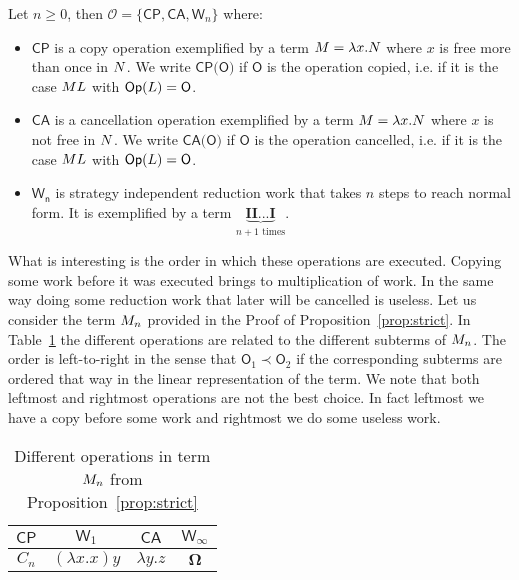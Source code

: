 \begin{definition} Let $n\geq 0$, then $\mathcal{O}=\{\textsf{CP},\textsf{CA},\textsf{W}_n\}$ where:
	\begin{itemize}
		\item $\textsf{CP}$ is a copy operation exemplified by a term $M=\lambda x.N$ where $x$ is free more than once in $N$. We write $\textsf{CP(O)}$ if $\mathsf{O}$ is the operation copied, i.e. if it is the case $ML$ with $\mathsf{Op}(L)=\mathsf{O}$.
		\item $\textsf{CA}$ is a cancellation operation exemplified by a term $M=\lambda x.N$ where $x$ is not free in $N$. We write $\textsf{CA(O)}$ if $\mathsf{O}$ is the operation cancelled, i.e. if it is the case $ML$ with $\mathsf{Op}(L)=\mathsf{O}$.
		\item $\mathsf{W_n}$ is strategy independent reduction work that takes $n$ steps to reach normal form. It is exemplified by a term $\underbrace{\textbf{II...I}}_{n+1\text{ times}}$.
	\end{itemize}
\end{definition}
What is interesting is the order in which these operations are executed. Copying some work before it was executed brings to multiplication of work. In the same way doing some reduction work that later will be cancelled is useless. Let us consider the term $M_n$ provided in the Proof of Proposition~\ref{prop:strict}. In Table~\ref{table:op1} the different operations are related to the different subterms of $M_n$. The order is left-to-right in the sense that $\textsf{O}_1\prec\mathsf{O}_2$ if the corresponding subterms are ordered that way in the linear representation of the term. We note that both leftmost and rightmost operations are not the best choice. In fact leftmost we have a copy before some work and rightmost we do some useless work.
\begin{table}
\begin{center}
\begin{tabular}{|c|c|c|c|}
	\hline 
	$ \textsf{CP} $ & $ \textsf{W}_1 $ & $ \textsf{CA} $ & $ \textsf{W}_\infty $\tabularnewline
	\hline 
	$C_n$ & $(\lambda x.x)y$ & $\lambda y.z$ & $\bm{\Omega}$\tabularnewline
	\hline 
\end{tabular}
\end{center}
\caption{Different operations in term $M_n$ from Proposition~\ref{prop:strict}}
\label{table:op1}
\end{table}